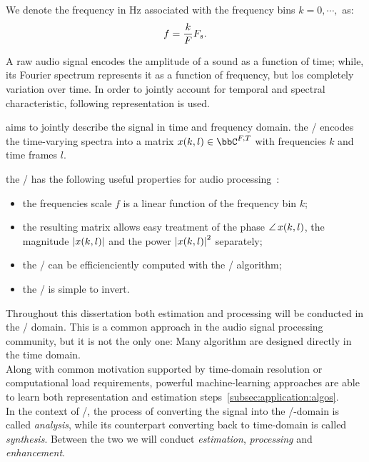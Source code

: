 We denote the frequency in $\si{\Hz}$ associated with the frequency bins $k = 0, \cdots, $ as:
\begin{equation}
    f = \frac{k}{F}F_s.
\end{equation}

A raw audio signal encodes the amplitude of a sound as a function of time; while, its Fourier spectrum
represents it as a function of frequency, but los completely variation over time.
In order to jointly account for temporal and spectral characteristic, following representation is used.

 aims to jointly describe the signal in time and frequency domain.
the \STFTdef/ encodes the time-varying spectra into a matrix $x(k,l) \in \bbC^{F,T}$ with frequencies $k$ and time frames $l$.

the \STFT/ has the following useful properties for audio processing~\cite{vincent2018audio}:
\begin{itemize}
    \item the frequencies scale $f$ is a linear function of the frequency bin $k$;
    \item the resulting matrix allows easy treatment of
          the phase $\operatorname*{\angle}{x(k,l)}$, the magnitude $\magnitudeOf{x(k,l)}$ and the power $\powerOf{x(k,l)}$ separately;
    \item the \DFT/ can be efficienciently computed with the \FFT/ algorithm;
    \item the \STFT/ is simple to invert.
\end{itemize}

Throughout this dissertation both estimation and processing will be conducted in the  \TF/ domain.
This is a common approach in the audio signal processing community, but it is not the only one:
Many algorithm are designed directly in the time domain.
\\Along with common motivation supported by time-domain resolution or computational load requirements,
powerful machine-learning approaches are able to learn both representation and estimation steps~\cref{subsec:application:algos}.
\\In the context of \STFT/, the process of converting the signal into the \TF/-domain is called \textit{analysis}, while
its counterpart converting back to time-domain is called \textit{synthesis}.
Between the two we will conduct \textit{estimation}, \textit{processing} and \textit{enhancement}.


